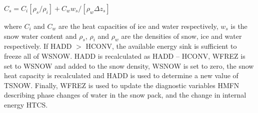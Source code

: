 $C_s = C_i [\rho_s /\rho_i] + C_w w_s/[\rho_w \Delta z_s]$

where $C_i$ and $C_w$ are the heat capacities of ice and water respectively, $w_s$ is the snow water content and $\rho_s$, $\rho_i$ and $\rho_w$ are the densities of snow, ice and water respectively. If H\+A\+D\+D $>$ H\+C\+O\+N\+V, the available energy sink is sufficient to freeze all of W\+S\+N\+O\+W. H\+A\+D\+D is recalculated as H\+A\+D\+D – H\+C\+O\+N\+V, W\+F\+R\+E\+Z is set to W\+S\+N\+O\+W and added to the snow density, W\+S\+N\+O\+W is set to zero, the snow heat capacity is recalculated and H\+A\+D\+D is used to determine a new value of T\+S\+N\+O\+W. Finally, W\+F\+R\+E\+Z is used to update the diagnostic variables H\+M\+F\+N describing phase changes of water in the snow pack, and the change in internal energy H\+T\+C\+S.